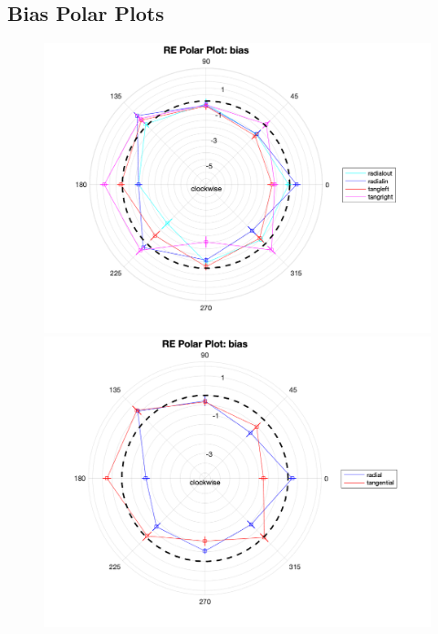 \documentclass[11pt]{article} %
\begin{document}
\subsection{Bias Polar Plots}
\begin{figure}[H]
\centering %
\includegraphics[scale=.3]{Images/RE_PP_bias_Alldata_4conds.png}
\includegraphics[scale=.3]{Images/RE_PP_bias_Alldata_2conds.png}
\end{figure}
\end{document}
